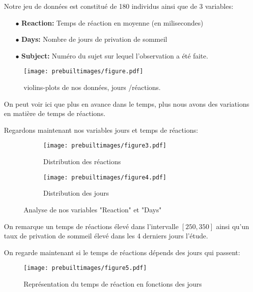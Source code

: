 Notre jeu de données est constitué de 180 individus ainsi que de 3 variables:

\begin{itemize}

    \item[$\bullet$] \textbf{Reaction:} Temps de réaction en moyenne (en milisecondes)
    
    \item[$\bullet$] \textbf{Days:} Nombre de jours de privation de sommeil
    
    \item[$\bullet$] \textbf{Subject:} Numéro du sujet sur lequel l'observation a été faite.
    
\end{itemize}

\begin{figure}[H]
    \centering
    \texttt{[image: prebuiltimages/figure.pdf]}
    \caption{violins-plots de nos données, jours /réactions.}
\end{figure}

On peut voir ici que plus en avance dans le temps, plus nous avons des variations en matière de temps de réactions.

\newpage

Regardons maintenant nos variables jours et temps de réactions:

\begin{figure}[H]
\centering
\begin{subfigure}{.5\textwidth}
  \centering
  \texttt{[image: prebuiltimages/figure3.pdf]}
  \caption{Distribution des réactions}
\end{subfigure}%
\begin{subfigure}{.5\textwidth}
  \centering
  \texttt{[image: prebuiltimages/figure4.pdf]}
  \caption{Distribution des jours}
\end{subfigure}
\caption{Analyse de nos variables "Reaction" et "Days"}
\label{fig:test}
\end{figure}

On remarque un temps de réactions élevé dans l'intervalle $[250,350]$ ainsi qu'un taux de privation de sommeil élevé dans les 4 derniers jours l'étude.


On regarde maintenant si le temps de réactions dépends des jours qui passent:

\begin{figure}[H]
    \centering
    \texttt{[image: prebuiltimages/figure5.pdf]}
    \caption{Représentation du temps de réaction en fonctions des jours}
\end{figure}

